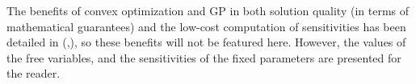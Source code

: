 The benefits of convex optimization and \gls{GP} in both solution
quality (in terms of mathematical guarantees) and the low-cost
computation of sensitivities has been detailed in (\cite{gp_ac_design},\cite{sp_ac_design}),
so these benefits will not be featured here. However, the values of the free variables,
and the sensitivities of the fixed parameters are presented for the reader.

\begin{center}

    \label{t:SimPleAC_results}
\end{center}

\begin{center}

    \label{t:SimPleAC_sens}
\end{center}



